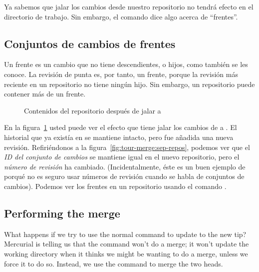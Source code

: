 Ya sabemos que jalar los cambios desde nuestro repositorio
 no tendrá efecto en el directorio de trabajo.
Sin embargo, el comando  dice algo acerca de
``frentes''.  

\subsection{Conjuntos de cambios de frentes}

Un frente es un cambio que no tiene descendientes, o hijos, como
también se les conoce. La revisión de punta es, por tanto, un frente,
porque la revisión más reciente en un repositorio no tiene ningún
hijo. Sin embargo, un repositorio puede contener más de un frente.

\begin{figure}[ht]
  \centering
  \caption{Contenidos del repositorio después de jalar
       a }
  \label{fig:tour-merge:pull}
\end{figure}

En la figura~\ref{fig:tour-merge:pull} usted puede ver el efecto que
tiene jalar los cambios de  a .
El historial que ya existía en  se mantiene
intacto, pero fue añadida una nueva revisión. Refiriéndonos a la
figura~\ref{fig:tour-merge:sep-repos}, podemos ver que el \emph{ID del
conjunto de cambios} se mantiene igual en el nuevo repositorio, pero
el \emph{número de revisión} ha cambiado.  (Incidentalmente, éste es un
buen ejemplo de porqué no es seguro usar números de revisión cuando se
habla de conjuntos de cambios).  Podemos ver los frentes en un
repositorio usando el comando .

\subsection{Performing the merge}

What happens if we try to use the normal  command to
update to the new tip?
Mercurial is telling us that the  command won't do a
merge; it won't update the working directory when it thinks we might
be wanting to do a merge, unless we force it to do so.  Instead, we
use the  command to merge the two heads.


